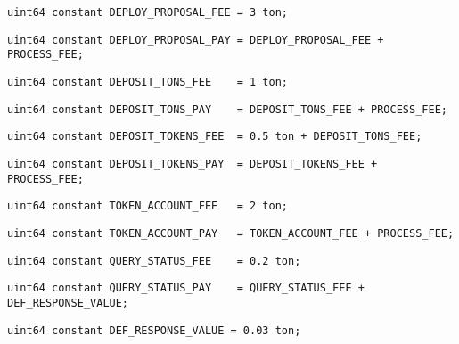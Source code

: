 \begin{lstlisting}[firstnumber=18]
    uint64 constant DEPLOY_PROPOSAL_FEE = 3 ton;
\end{lstlisting}

\begin{lstlisting}[firstnumber=19]
    uint64 constant DEPLOY_PROPOSAL_PAY = DEPLOY_PROPOSAL_FEE + PROCESS_FEE;
\end{lstlisting}

\begin{lstlisting}[firstnumber=20]
    uint64 constant DEPOSIT_TONS_FEE    = 1 ton;
\end{lstlisting}

\begin{lstlisting}[firstnumber=21]
    uint64 constant DEPOSIT_TONS_PAY    = DEPOSIT_TONS_FEE + PROCESS_FEE;
\end{lstlisting}

\begin{lstlisting}[firstnumber=22]
    uint64 constant DEPOSIT_TOKENS_FEE  = 0.5 ton + DEPOSIT_TONS_FEE;
\end{lstlisting}

\begin{lstlisting}[firstnumber=23]
    uint64 constant DEPOSIT_TOKENS_PAY  = DEPOSIT_TOKENS_FEE + PROCESS_FEE;
\end{lstlisting}

\begin{lstlisting}[firstnumber=24]
    uint64 constant TOKEN_ACCOUNT_FEE   = 2 ton;
\end{lstlisting}

\begin{lstlisting}[firstnumber=25]
    uint64 constant TOKEN_ACCOUNT_PAY   = TOKEN_ACCOUNT_FEE + PROCESS_FEE;
\end{lstlisting}

\begin{lstlisting}[firstnumber=26]
    uint64 constant QUERY_STATUS_FEE    = 0.2 ton;
\end{lstlisting}

\begin{lstlisting}[firstnumber=27]
    uint64 constant QUERY_STATUS_PAY    = QUERY_STATUS_FEE + DEF_RESPONSE_VALUE;
\end{lstlisting}

\begin{lstlisting}[firstnumber=29]
    uint64 constant DEF_RESPONSE_VALUE = 0.03 ton;
\end{lstlisting}

